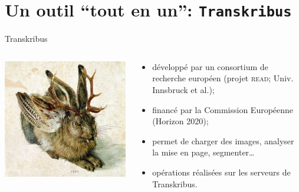 \documentclass[ignorenonframetext]{beamer}
\begin{document}


\section{Un outil ``tout en un'': \texttt{Transkribus}}

\begin{frame}{Transkribus}

\begin{columns}
\begin{column}{0.45\textwidth}
\includegraphics[width=\textwidth]{img/wolpertinger.jpg}
\end{column}
\begin{column}{0.45\textwidth}
\begin{itemize}
\item développé par un consortium de recherche européen (projet \textsc{read}; Univ. Innsbruck et al.);
\item financé par la Commission Européenne (Horizon 2020);
\item permet de charger des images, analyser la mise en page, segmenter…
\item opérations réalisées sur les \alert{serveurs de Transkribus}.
\end{itemize}
\end{column}
\end{columns}

\end{frame}
\end{document}
